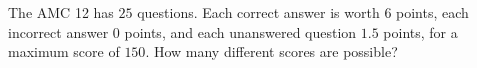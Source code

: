 The AMC 12 has $25$ questions. Each correct answer is worth $6$ points, each incorrect answer $0$ points, and each unanswered question $1.5$ points, for a maximum score of $150$. How many different scores are possible?
